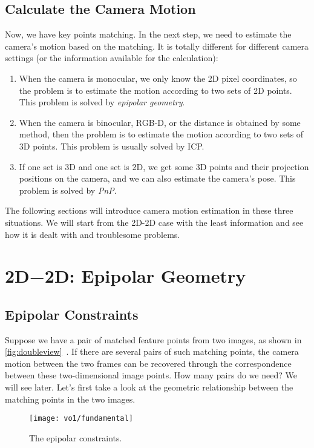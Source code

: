 \subsection{Calculate the Camera Motion}
Now, we have key points matching. In the next step, we need to estimate the camera's motion based on the matching. It is totally different for different camera settings (or the information available for the calculation):

\begin{enumerate}
	\item When the camera is monocular, we only know the 2D pixel coordinates, so the problem is to estimate the motion according to two sets of 2D points. This problem is solved by \textit{epipolar geometry}.
	\item When the camera is binocular, RGB-D, or the distance is obtained by some method, then the problem is to estimate the motion according to two sets of 3D points. This problem is usually solved by ICP.
	\item If one set is 3D and one set is 2D, we get some 3D points and their projection positions on the camera, and we can also estimate the camera's pose. This problem is solved by \textit{PnP}.
\end{enumerate}

The following sections will introduce camera motion estimation in these three situations. We will start from the 2D-2D case with the least information and see how it is dealt with and troublesome problems.

\section{2D−2D: Epipolar Geometry}
\label{sec:epipolar-geometry}

\subsection{Epipolar Constraints}

Suppose we have a pair of matched feature points from two images, as shown in \autoref{fig:doubleview}~. If there are several pairs of such matching points, the camera motion between the two frames can be recovered through the correspondence between these two-dimensional image points. How many pairs do we need? We will see later. Let's first take a look at the geometric relationship between the matching points in the two images.

\begin{figure}[!htp]
	\centering
	\texttt{[image: vo1/fundamental]}
	\caption{The epipolar constraints.}
	\label{fig:doubleview}
\end{figure}

